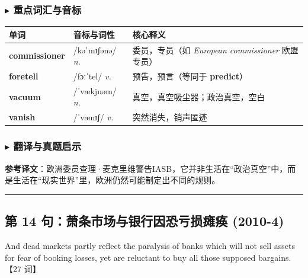 \documentclass[cn,normal,11pt]{elegantnote}
\newcommand{\retrokey}[1]{{\color{accentcolor}\textbf{#1}}}
\renewcommand{\citshape}{\kaishu\fontspec{Arial}}
\begin{document}
\subsubsection*{$\blacktriangleright$ 重点词汇与音标}
\noindent
\begin{tabularx}{\textwidth}{l X p{7cm}}
  \toprule
  \textbf{单词} & \textbf{音标与词性} & \textbf{核心释义} \\
  \midrule
  \retrokey{commissioner} & {\citshape /kəˈmɪʃənə/} \textit{n.} & 委员，专员（如 \textit{European commissioner} 欧盟专员） \\
  \midrule
  \retrokey{foretell} & {\citshape /fɔːˈtel/} \textit{v.} & 预告，预言（等同于 \textbf{predict}） \\
  \midrule
  \retrokey{vacuum} & {\citshape /ˈvækjuəm/} \textit{n.} & 真空，真空吸尘器；政治真空，空白 \\
  \midrule
  \retrokey{vanish} & {\citshape /ˈvænɪʃ/} \textit{v.} & 突然消失，销声匿迹 \\
  \bottomrule
\end{tabularx}

\subsubsection*{$\blacktriangleright$ 翻译与真题启示}
\begin{remark}
  \textbf{参考译文}：欧洲委员查理·麦克里维警告IASB，它并非生活在“政治真空”中，而是生活在“现实世界”里，欧洲仍然可能制定出不同的规则。
\end{remark}

\par\vspace{10pt}\hrule\vspace{10pt}

\subsection{第 14 句：萧条市场与银行因恐亏损瘫痪 (2010-4)}

\begin{note}
  And dead markets partly reflect the paralysis of banks which will not sell assets for fear of booking losses, yet are reluctant to buy all those supposed bargains. 【27 词】
\end{note}
\end{document}
